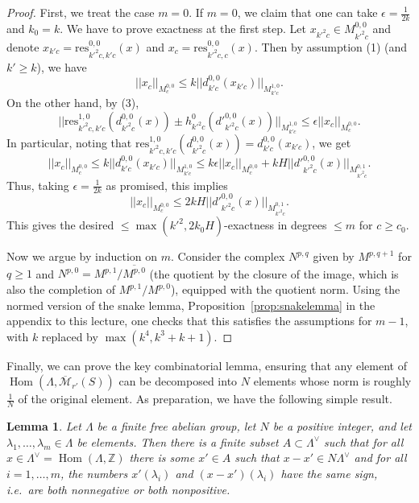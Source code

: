 \documentclass[11pt]{amsart}
\DeclareMathOperator{\Hom}{Hom}
\numberwithin{equation}{section}
\numberwithin{theorem}{section}
\newtheorem{lemma}[theorem]{Lemma}
\theoremstyle{definition}
\begin{document}
\begin{proof} First, we treat the case $m=0$. If $m=0$, we claim that one can take $\epsilon=\tfrac 1{2k}$ and $k_0=k$. We have to prove exactness at the first step. Let $x_{k'^2c}\in M^{0,0}_{k'^2c}$ and denote $x_{k'c}=\mathrm{res}_{k'^2c,k'c}^{0,0}(x)$ and $x_c=\mathrm{res}_{k'^2c,c}^{0,0}(x)$. Then by assumption (1) (and $k'\geq k$), we have
\[
||x_c||_{M^{0,0}_c}\leq k||d^{0,0}_{k'c}(x_{k'c})||_{M^{1,0}_{k'c}}.
\]
On the other hand, by (3),
\[
||\mathrm{res}_{k'^2c,k'c}^{1,0}(d^{0,0}_{k'^2c}(x))\pm h^0_{k'^2c}(d'^{0,0}_{k'^2c}(x))||_{M^{1,0}_{k'c}}\leq \epsilon ||x_c||_{M^{0,0}_c}.
\]
In particular, noting that $\mathrm{res}_{k'^2c,k'c}^{1,0}(d^{0,0}_{k'^2c}(x)) = d^{0,0}_{k'c}(x_{k'c})$, we get
\[
||x_c||_{M^{0,0}_c}\leq k||d^{0,0}_{k'c}(x_{k'c})||_{M^{1,0}_{k'c}}\leq k\epsilon ||x_c||_{M^{0,0}_c} + kH ||d'^{0,0}_{k'^2c}(x)||_{M^{0,1}_{k'^2c}}.
\]
Thus, taking $\epsilon=\tfrac 1{2k}$ as promised, this implies
\[
||x_c||_{M^{0,0}_c}\leq 2kH ||d'^{0,0}_{k'^2c}(x)||_{M^{0,1}_{k'^2c}}.
\]
This gives the desired $\leq \max(k'^2,2k_0H)$-exactness in degrees $\leq m$ for $c\geq c_0$.

Now we argue by induction on $m$. Consider the complex $N^{p,q}$ given by $M^{p,q+1}$ for $q\geq 1$ and $N^{p,0} = M^{p,1}/\overline{M^{p,0}}$ (the quotient by the closure of the image, which is also the completion of $M^{p,1}/M^{p,0}$), equipped with the quotient norm. Using the normed version of the snake lemma, Proposition~\ref{prop:snakelemma} in the appendix to this lecture, one checks that this satisfies the assumptions for $m-1$, with $k$ replaced by $\max(k^4,k^3+k+1)$.
\end{proof}

Finally, we can prove the key combinatorial lemma, ensuring that any element of $\Hom(\Lambda,\overline{\mathcal M}_{r'}(S))$ can be decomposed into $N$ elements whose norm is roughly $\tfrac 1N$ of the original element. As preparation, we have the following simple result.

\begin{lemma} Let $\Lambda$ be a finite free abelian group, let $N$ be a positive integer, and let $\lambda_1,\ldots,\lambda_m\in \Lambda$ be elements. Then there is a finite subset $A\subset \Lambda^\vee$ such that for all $x\in \Lambda^\vee=\Hom(\Lambda,\mathbb Z)$ there is some $x'\in A$ such that $x-x'\in N\Lambda^\vee$ and for all $i=1,\ldots,m$, the numbers $x'(\lambda_i)$ and $(x-x')(\lambda_i)$ have the same sign, i.e.~are both nonnegative or both nonpositive.
\end{lemma}
\end{document}
